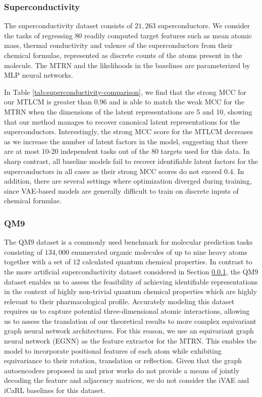 \documentclass{article} %
\theoremstyle{plain}
\theoremstyle{definition}
\theoremstyle{remark}
\begin{document}
\subsubsection{Superconductivity}\label{sec:superconduct}
\vspace{-0.5ex}
The superconductivity dataset \citep{hamidieh2018super} consists of $21,263$ superconductors. We consider the tasks of regressing $80$ readily computed target features such as mean atomic mass, thermal conductivity and valence of the superconductors from their chemical formulae, represented as discrete counts of the atoms present in the molecule. The MTRN and the likelihoods in the baselines are parameterized by MLP neural networks.

In Table \ref{tab:superconductivity-comparison}, we find that the strong MCC for our MTLCM is greater than $0.96$ and is able to match the weak MCC for the MTRN when the dimensions of the latent representations are 5 and 10, showing that our method manages to recover canonical latent representations for the superconductors. Interestingly, the strong MCC score for the MTLCM decreases as we increase the number of latent factors in the model, suggesting that there are at most 10-20 independent tasks out of the 80 targets used for this data. In sharp contrast, all baseline models fail to recover identifiable latent factors for the superconductors in all cases as their strong MCC scores do not exceed $0.4$. In addition, there are several settings where optimization diverged during training, since VAE-based models are generally difficult to train on discrete inputs of chemical formulae.

\subsubsection{QM9}

The QM9 dataset \citep{qm9, qm9_2} is a commonly used benchmark for molecular prediction tasks consisting of $134,000$ enumerated organic molecules of up to nine heavy atoms together with a set of $12$ calculated quantum chemical properties. 
In contrast to the more artificial superconductivity dataset considered in Section \ref{sec:superconduct}, the QM9 dataset enables us to assess the feasibility of achieving identifiable representations in the context of highly non-trivial quantum chemical properties which are highly relevant to their pharmacological profile.
Accurately modeling this dataset requires us to capture potential three-dimensional atomic interactions, allowing us to assess the translation of our theoretical results to more complex equivariant graph neural network architectures.  For this reason, we use an equivariant graph neural network (EGNN) \citep{egnn} as the feature extractor for the MTRN. This enables the model to incorporate positional features of each atom while exhibiting equivariance to their rotation, translation or reflection. Given that the graph autoencoders proposed in \citet{egnn} and prior works \citep{Kipf_Welling_2016, Simonovsky_Komodakis_2018, Liu_Kumar_Ba_Kiros_Swersky_2019} do not provide a means of jointly decoding the feature and adjacency matrices, we do not consider the iVAE and iCaRL baselines for this dataset.
\end{document}
